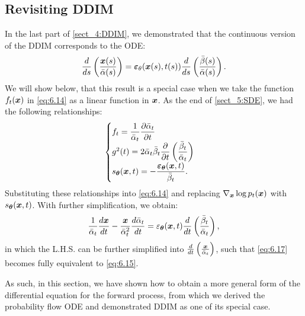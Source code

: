 \subsection{Revisiting DDIM}
In the last part of \cref{sect_4:DDIM}, we demonstrated that the continuous version of the DDIM corresponds to the ODE:
\begin{equation}
    \label{eq:6.15}
    \frac{d}{ds}\left( \frac{\bm{x}(s)}{\bar{\alpha}(s)}\right)=\bm{\varepsilon}_\theta(\bm{x}(s),t(s))\frac{d}{ds}\left(\frac{\bar{\beta}(s)}{\bar{\alpha}(s)} \right).
\end{equation}
We will show below, that this result is a special case when we take the function $f_t(\bm{x})$ in \cref{eq:6.14} as a linear function in $\bm{x}$. As the end of \cref{sect_5:SDE}, we had the following relationships:
\begin{equation}
\label{eq:6.16}
    \begin{cases}
        f_{t}=\displaystyle{\frac{1}{\bar{\alpha}_t}\frac{\partial\bar{\alpha}_t}{\partial t}}\\
        g^2(t)=\displaystyle{2\bar{\alpha}_t\bar{\beta}_t\frac{\partial}{\partial t}\left( \frac{\bar{\beta}_t}{\bar{\alpha}_t}\right)} \\
        s_{\bm{\theta}}(\bm{x},t)=\displaystyle{-\frac{\bm{\varepsilon}_{\bm{\theta}}(\bm{x},t)}{\bar{\beta}_t}}. 
    \end{cases}
\end{equation}
Substituting these relationships into \cref{eq:6.14} and replacing $\nabla_{\bm{x}}\log p_{t}(\bm{x})$ with $s_{\bm{\theta}}(\bm{x},t)$. With further simplification, we obtain:
\begin{equation}
    \label{eq:6.17}
    \frac{1}{\bar{\alpha}_t}\frac{d\bm{x}}{dt}-\frac{\bm{x}}{\bar{\alpha}_t^2}\frac{d\bar{\alpha}_t}{dt}=\varepsilon_{\bm{\theta}}(\bm{x},t)\frac{d}{dt}\left( \frac{\bar{\beta}_t}{\bar{\alpha}_t}\right),
\end{equation}
in which the L.H.S. can be further simplified into $\frac{d}{dt}\left( \frac{\bm{x}}{\bar{\alpha}_t}\right)$, such that \cref{eq:6.17} becomes fully equivalent to \cref{eq:6.15}.

As such, in this section, we have shown how to obtain a more general form of the differential equation for the forward process, from which we derived the probability flow ODE and demonstrated DDIM as one of its special case.
